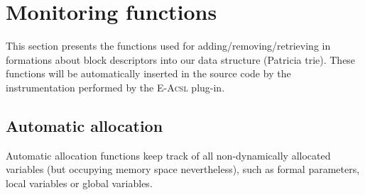\documentclass[a4paper,11pt]{article}
\begin{document}






\section{Monitoring functions}
\label{section:lib}


This section presents the functions used for adding/removing/retrieving in
formations about block descriptors into our data structure (Patricia trie).
These functions will be automatically inserted in the source code by the
instrumentation performed by the \textsc{E-Acsl} plug-in.


\subsection{Automatic allocation}

Automatic allocation functions keep track of all non-dynamically allocated
variables (but occupying memory space nevertheless), such as formal parameters,
local variables or global variables.
\end{document}
